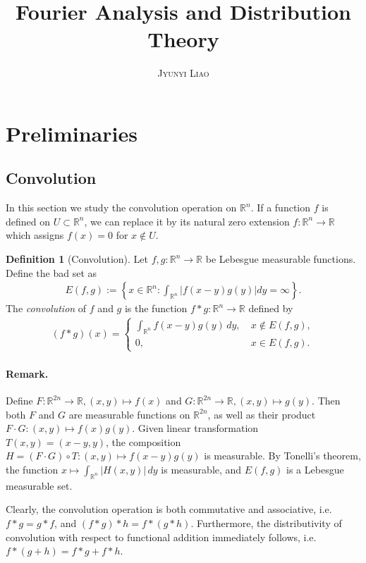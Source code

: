 \documentclass{article}
\title{\bf Fourier Analysis and Distribution Theory}
\author{\textsc{Jyunyi Liao}}
\date{}
\numberwithin{equation}{section}
\newcommand{\bbR}{\mathbb{R}}
\theoremstyle{plain}
\theoremstyle{definition}
\newtheorem{definition}[theorem]{Definition}
\begin{document}
\maketitle
\tableofcontents

\newpage
\section{Preliminaries}
\subsection{Convolution}
In this section we study the convolution operation on $\bbR^n$. If a function $f$ is defined on $U\subset\bbR^n$, we can replace it by its natural zero extension $f:\bbR^n\to\bbR$ which assigns $f(x)=0$ for $x\notin U$.
\begin{definition}[Convolution]
	\label{def:1.1} Let $f,g:\bbR^n\to\mathbb{R}$ be Lebesgue measurable functions. Define the bad set as
	\begin{align*}
		E(f,g) := \left\{x\in\bbR^n:\int_{\bbR^n}\left\vert f(x-y)g(y)\right\vert dy = \infty\right\}.
	\end{align*}
	The \textit{convolution} of $f$ and $g$ is the function $f * g:\mathbb{R}^n\to\mathbb{R}$ defined by
	\begin{align*}
		(f*g)(x) = \begin{cases}
			\int_{\bbR^n} f(x-y)g(y)\,dy,\ &x\notin E(f,g),\\
			0,\ &x\in E(f,g).
		\end{cases}
	\end{align*}
\end{definition}
\paragraph{Remark.} Define $F:\bbR^{2n}\to\mathbb{R},(x,y)\mapsto f(x)$ and $G:\bbR^{2n}\to\mathbb{R},(x,y)\mapsto g(y)$. Then both $F$ and $G$ are measurable functions on $\mathbb{R}^{2n}$, as well as their product $F\cdot G:(x,y)\mapsto f(x)g(y)$. Given linear transformation $T(x,y)=(x-y,y)$, the composition $H=(F\cdot G)\circ T: (x,y)\mapsto f(x-y)g(y)$ is measurable. By Tonelli's theorem, the function $x\mapsto\int_{\bbR^n}\vert H(x,y)\vert\,dy$ is measurable, and $E(f,g)$ is a Lebesgue measurable set.

Clearly, the convolution operation is both commutative and associative, i.e. $f*g=g*f$, and $(f*g)*h = f*(g*h)$. Furthermore, the distributivity of convolution with respect to functional addition immediately follows, i.e. $f*(g+h)=f*g+f*h$.
\end{document}
